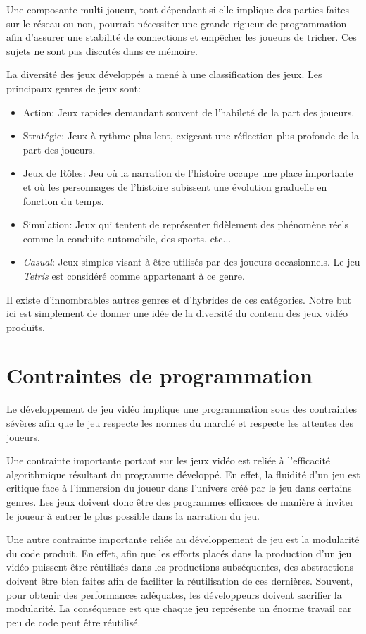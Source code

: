 \documentclass[12pt,twoside,letterpaper,francais]{book}
\begin{document}
Une composante multi-joueur, tout dépendant si elle implique des
parties faites sur le réseau ou non, pourrait nécessiter une grande
rigueur de programmation afin d'assurer une stabilité de connections et
empêcher les joueurs de tricher. Ces sujets ne sont pas discutés dans
ce mémoire.

La diversité des jeux développés a mené à une classification des
jeux. Les principaux genres de jeux sont:

\begin{itemize}
\item Action: Jeux rapides demandant souvent de l'habileté de la part
  des joueurs.
\item Stratégie: Jeux à rythme plus lent, exigeant une réflection plus
  profonde de la part des joueurs.
\item Jeux de Rôles: Jeu où la narration de l'histoire occupe une
  place importante et où les personnages de l'histoire subissent une
  évolution graduelle en fonction du temps.
\item Simulation: Jeux qui tentent de représenter fidèlement des
  phénomène réels comme la conduite automobile, des sports, etc...
\item \textit{Casual}: Jeux simples visant à être utilisés par des
  joueurs occasionnels. Le jeu \textit{Tetris} est considéré comme
  appartenant à ce genre.
\end{itemize}

Il existe d'innombrables autres genres et d'hybrides de ces
catégories. Notre but ici est simplement de donner une idée de la
diversité du contenu des jeux vidéo produits.


\FloatBarrier
\section{Contraintes de programmation}
Le développement de jeu vidéo implique une programmation sous des
contraintes sévères afin que le jeu respecte les normes du marché
et respecte les attentes des joueurs.

Une contrainte importante portant sur les jeux vidéo est reliée à
l'efficacité algorithmique résultant du programme développé. En effet,
la fluidité d'un jeu est critique face à l'immersion du joueur dans
l'univers créé par le jeu dans certains genres. Les jeux doivent donc
être des programmes efficaces de manière à inviter le joueur à entrer
le plus possible dans la narration du jeu.

Une autre contrainte importante reliée au développement de jeu est la
modularité du code produit. En effet, afin que les efforts placés dans
la production d'un jeu vidéo puissent être réutilisés dans les
productions subséquentes, des abstractions doivent être bien faites
afin de faciliter la réutilisation de ces dernières. Souvent, pour
obtenir des performances adéquates, les développeurs doivent sacrifier
la modularité. La conséquence est que chaque jeu représente un énorme
travail car peu de code peut être réutilisé.
\end{document}
